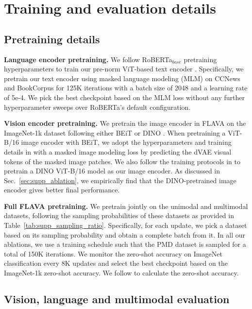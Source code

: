 \documentclass[10pt,twocolumn,letterpaper]{article}
\newcommand{\myparagraph}[1]{\vspace{0.25em}\noindent\textbf{#1}}
\begin{document}
\section{Training and evaluation details}
\subsection{Pretraining details}

\myparagraph{Language encoder pretraining.} We follow RoBERTa$_{base}$ pretraining hyperparameters to train our pre-norm ViT-based text encoder \cite{liu2019roberta}. Specifically, we pretrain our text encoder using masked language modeling (MLM) \cite{devlin2018bert} on CCNews and BookCorpus for 125K iterations with a batch size of 2048 and a learning rate of 5e-4. We pick the best checkpoint based on the MLM loss without any further hyperparameter sweeps over RoBERTa's default configuration.

\myparagraph{Vision encoder pretraining.} We pretrain the image encoder in FLAVA on the ImageNet-1k dataset following either BEiT \cite{bao2021beit} or DINO \cite{caron2021emerging}. When pretraining a ViT-B/16 image encoder with BEiT, we adopt the hyperparameters and training details in \cite{bao2021beit} with a masked image modeling loss by predicting the dVAE visual tokens of the masked image patches. We also follow the training protocols in \cite{caron2021emerging} to pretrain a DINO ViT-B/16 model as our image encoder. As discussed in Sec.~\ref{sec:supp_ablation}, we empirically find that the DINO-pretrained image encoder gives better final performance.

\myparagraph{Full FLAVA pretraining.} We pretrain jointly on the unimodal and multimodal datasets, following the sampling probabilities of these datasets as provided in Table~\ref{tab:supp_sampling_ratio}. Specifically, for each update, we pick a dataset based on its sampling probability and obtain a complete batch from it. In all our ablations, we use a training schedule such that the PMD dataset is sampled for a total of 150K iterations. We monitor the zero-shot accuracy on ImageNet classification \cite{imagenet} every 8K updates and select the best checkpoint based on the ImageNet-1k zero-shot accuracy. We follow \cite{radford2021learning} to calculate the zero-shot accuracy.

\subsection{Vision, language and multimodal evaluation}
\end{document}
